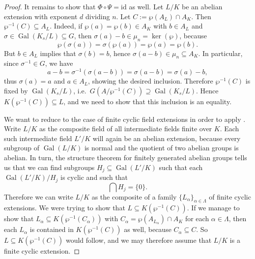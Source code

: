 \documentclass[12pt]{amsart}
\DeclareMathOperator{\Gal}{Gal}
\newcommand{\id}{\mathrm{id}}
\begin{document}
\begin{thm}
\begin{proof}
	It remains to show that $\Phi\circ \Psi=\id$ as well.
	Let $L/K$ be an abelian extension with exponent $d$ dividing $n$.
	Let $C:=\wp(A_{L})\cap A_{K}$.
	Then $\wp^{-1}(C)\subseteq A_{L}$.
	Indeed, if $\wp(a)=\wp(b)\in A_{K}$ with $b\in A_{L}$ and $\sigma\in \Gal(K_{s}/L)\subseteq G$, then $\sigma(a)-b\in \mu_{n}=\ker(\wp)$, because
	\[ \wp(\sigma(a))=\sigma(\wp(a))=\wp(a)=\wp(b). \]
	But $b\in A_{L}$ implies that $\sigma(b)=b$, hence $\sigma(a-b)\in \mu_{n}\subseteq A_{K}$.
	In particular, since $\sigma^{-1}\in G$, we have
	\[ a-b=\sigma^{-1}(\sigma(a-b))=\sigma(a-b)=\sigma(a)-b, \]
	thus $\sigma(a)=a$ and $a\in A_{L}$, showing the desired inclusion.
	Therefore $\wp^{-1}(C)$ is fixed by $\Gal(K_{s}/L)$, i.e.~$G(A/\wp^{-1}(C))\supseteq \Gal(K_{s}/L)$.
	Hence $K(\wp^{-1}(C))\subseteq L$, and we need to show that this inclusion is an equality.
	
	We want to reduce to the case of finite cyclic field extensions in order to apply .
	Write $L/K$ as the composite field of all intermediate fields finite over $K$.
	Each such intermediate field $L'/K$ will again be an abelian extension, because every subgroup of $\Gal(L/K)$ is normal and the quotient of two abelian groups is abelian.
	In turn, the structure theorem for finitely generated abelian groups tells us that we can find subgroups $H_{j}\subseteq \Gal(L'/K)$ such that each $\Gal(L'/K)/H_{j}$ is cyclic and such that
	\[ \bigcap H_{j}=\{ 0 \}. \]
	Therefore we can write $L/K$ as the composite of a family $\{ L_{\alpha}\}_{\alpha\in \Lambda}$  of finite cyclic extensions.
	We were trying to show that $L\subseteq K(\wp^{-1}(C))$.
	If we manage to show that $L_{\alpha}\subseteq K(\wp^{-1}(C_{\alpha}))$ with $C_{\alpha}=\wp(A_{L_{\alpha}})\cap A_{K}$ for each $\alpha\in \Lambda$, then each $L_{\alpha}$ is contained in $K(\wp^{-1}(C))$ as well, because $C_{\alpha}\subseteq C$.
	So $L\subseteq K(\wp^{-1}(C))$ would follow, and we may therefore assume that $L/K$ is a finite cyclic extension.


\end{proof}
\end{thm}
\end{document}
